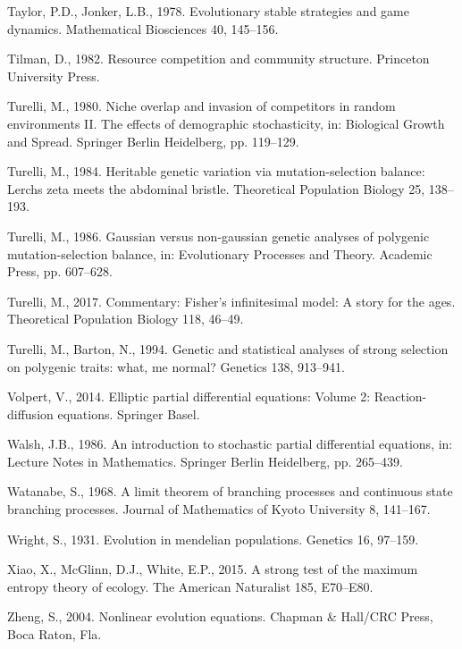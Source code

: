 \documentclass[]{elsarticle} %
\begin{document}
\leavevmode\hypertarget{ref-Taylor1978}{}%
Taylor, P.D., Jonker, L.B., 1978. Evolutionary stable strategies and
game dynamics. Mathematical Biosciences 40, 145--156.

\leavevmode\hypertarget{ref-davidtilman1982}{}%
Tilman, D., 1982. Resource competition and community structure.
Princeton University Press.

\leavevmode\hypertarget{ref-Turelli1980}{}%
Turelli, M., 1980. Niche overlap and invasion of competitors in random
environments II. The effects of demographic stochasticity, in:
Biological Growth and Spread. Springer Berlin Heidelberg, pp. 119--129.

\leavevmode\hypertarget{ref-Turelli1984}{}%
Turelli, M., 1984. Heritable genetic variation via mutation-selection
balance: Lerchs zeta meets the abdominal bristle. Theoretical Population
Biology 25, 138--193.

\leavevmode\hypertarget{ref-Turelli1986}{}%
Turelli, M., 1986. Gaussian versus non-gaussian genetic analyses of
polygenic mutation-selection balance, in: Evolutionary Processes and
Theory. Academic Press, pp. 607--628.

\leavevmode\hypertarget{ref-Turelli2017}{}%
Turelli, M., 2017. Commentary: Fisher's infinitesimal model: A story for
the ages. Theoretical Population Biology 118, 46--49.

\leavevmode\hypertarget{ref-pmid7851785}{}%
Turelli, M., Barton, N., 1994. Genetic and statistical analyses of
strong selection on polygenic traits: what, me normal? Genetics 138,
913--941.

\leavevmode\hypertarget{ref-Volpert2014}{}%
Volpert, V., 2014. Elliptic partial differential equations: Volume 2:
Reaction-diffusion equations. Springer Basel.

\leavevmode\hypertarget{ref-Walsh}{}%
Walsh, J.B., 1986. An introduction to stochastic partial differential
equations, in: Lecture Notes in Mathematics. Springer Berlin Heidelberg,
pp. 265--439.

\leavevmode\hypertarget{ref-Watanabe1968}{}%
Watanabe, S., 1968. A limit theorem of branching processes and
continuous state branching processes. Journal of Mathematics of Kyoto
University 8, 141--167.

\leavevmode\hypertarget{ref-Wright97}{}%
Wright, S., 1931. Evolution in mendelian populations. Genetics 16,
97--159.

\leavevmode\hypertarget{ref-Xiao2015}{}%
Xiao, X., McGlinn, D.J., White, E.P., 2015. A strong test of the maximum
entropy theory of ecology. The American Naturalist 185, E70--E80.

\leavevmode\hypertarget{ref-zheng2004nonlinear}{}%
Zheng, S., 2004. Nonlinear evolution equations. Chapman \& Hall/CRC
Press, Boca Raton, Fla.
\end{document}
